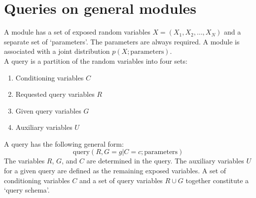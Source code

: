 \documentclass{article}
\begin{document}













% 



\section{Queries on general modules}

\noindent A module has a set of exposed random variables $X = (X_1, X_2, \ldots, X_N)$ and a separate set of `parameters'.
The parameters are always required.
A module is associated with a joint distribution $p(X; \mbox{parameters})$.\\

\noindent A query is a partition of the random variables into four sets:
\begin{enumerate}
    \item Conditioning variables $C$
    \item Requested query variables $R$
    \item Given query variables $G$
    \item Auxiliary variables $U$ %
\end{enumerate}
A query has the following general form:
\begin{equation}
    \mbox{query}(R, G=g | C=c; \mbox{parameters})
\end{equation}
The variables $R$, $G$, and $C$ are determined in the query.
The auxiliary variables $U$ for a given query are defined as the remaining exposed variables.
A set of conditioning variables $C$ and a set of query variables $R \cup G$ together constitute a `query schema'.\\
\end{document}
